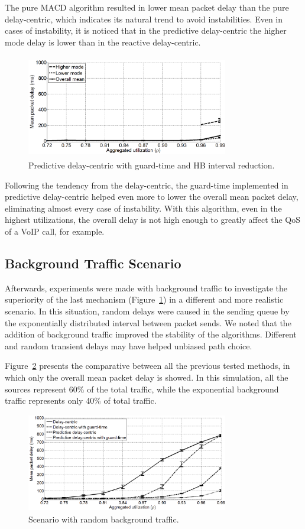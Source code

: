 \documentclass[letterpaper,10pt,oneside,conference,final]{sbrt2015}
\begin{document}
The pure MACD algorithm resulted in lower mean packet delay than the pure delay-centric, which indicates its natural trend to avoid instabilities. Even in cases of instability, it is noticed that in the predictive delay-centric the higher mode delay is lower than in the reactive delay-centric.

\begin{figure}[h!]
\centering
\includegraphics[width=8.8cm,height=4.5cm]{figura5}
\caption{Predictive delay-centric with guard-time and HB interval reduction.}
\label{figura5}
\end{figure}

Following the tendency from the delay-centric, the guard-time implemented in predictive delay-centric helped even more to lower the overall mean packet delay, eliminating almost every case of instability. With this algorithm, even in the highest utilizations, the overall delay is not high enough to greatly affect the QoS of a VoIP call, for example.

\subsection{Background Traffic Scenario}
Afterwards, experiments were made with background traffic to investigate the superiority of the last mechanism (Figure~\ref{figura5})  in a different and more realistic scenario. In this situation, random delays were caused in the sending queue by the exponentially distributed interval between packet sends. We noted that the addition of background traffic improved the stability of the algorithms. Different and random transient delays may have helped unbiased path choice.

Figure~\ref{figura6} presents the comparative between all the previous tested methods, in which only the overall mean packet delay is showed. In this simulation, all the sources represent 60\% of the total traffic, while the exponential background traffic represents only 40\% of total traffic.

\begin{figure}[h!]
\centering
\includegraphics[width=8.8cm,height=4.3cm]{figura6}
\caption{Scenario with random background traffic.}
\label{figura6}
\end{figure}
\end{document}
